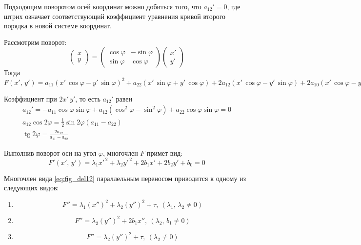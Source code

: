 \begin{lemma}
  Подходящим поворотом осей координат можно добиться того, что $a_{12}'= 0$, где штрих означает соответствующий коэффициент уравнения кривой второго порядка в новой системе координат.
\end{lemma}
\begin{Proof}
  Рассмотрим поворот: 
  $$
  \begin{pmatrix} x \\ y \end{pmatrix} = 
  \begin{pmatrix}
    \cos \varphi & -\sin \varphi \\
    \sin \varphi & \cos \varphi
  \end{pmatrix} \begin{pmatrix} x' \\ y' \end{pmatrix}
  $$
  Тогда $F(x', \, y') = a_{11}(x'\, \cos \varphi - y' \, \sin \varphi)^2 + a_{22} (x' \, \sin \varphi + y'\, \cos \varphi) + 2a_{12}(x' \, \cos \varphi - y' \, \sin \varphi) + 2a_{10}(x'\, \cos \varphi - y' \, \sin \varphi) + 2a_{20}(x' \, \sin \varphi + y' \, \cos \varphi) + a_{00} = 0$

  Коэффициент при $2x'\, y'$, то есть $a_{12}'$ равен
  \begin{gather*}
    a_{12}' = -a_{11}\cos \varphi \sin \varphi + a_{12}(\cos^2 \varphi - \sin^2 \varphi) + a_{22}\cos \varphi \sin \varphi  = 0 \\
    a_{12}\cos 2\varphi = \frac{1}{2} \sin 2\varphi (a_{11} - a_{22}) \\
    \operatorname{tg} 2 \varphi = \frac{2a_{12}}{a_{11} - a_{22}} 
  \end{gather*}
\end{Proof}
Выполнив поворот оси на угол $\varphi$, многочлен $F$ примет вид:
\begin{equation}
  \label{eq:fig_del12}
  F'(x', \, y') = \lambda_1 x'^{\, 2} + \lambda_2 y'^{\, 2} + 2b_1x' + 2b_2y' + b_0 = 0
\end{equation}
\begin{lemma}
  Многочлен вида \ref{eq:fig_del12} параллельным переносом приводится к одному из следующих видов:
  \begin{enumerate}
    \item \begin{equation}
      \label{eq:lemma_1}
      F'' = \lambda_1(x'')^2 + \lambda_2(y'')^2 + \tau, ~ (\lambda_1,\, \lambda_2 \neq 0)
    \end{equation}
    \item \begin{equation}
      \label{eq:lemma_2}
      F'' = \lambda_2(y'')^2 + 2b_1x'', ~ (\lambda_2, \, b_1 \neq 0)
    \end{equation}
      \item \begin{equation}
        \label{eq:lemma_3}
        F'' = \lambda_2(y'')^2 + \tau, ~ (\lambda_2 \neq 0)
      \end{equation}
  \end{enumerate}
\end{lemma}
